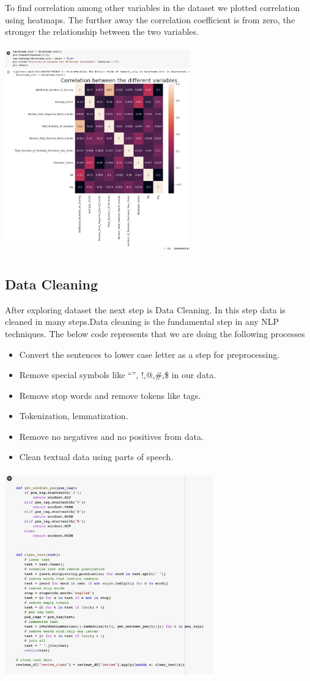 To find correlation among other variables in the dataset we plotted correlation using heatmaps. The further away the correlation coefficient is from zero, the stronger the relationship between the two variables.

\includegraphics[width=8cm, height=9cm ]{ccorellation.jpeg}

\subsection{Data Cleaning}
After exploring dataset the next step is Data Cleaning. In this step data is cleaned in many steps.Data cleaning is the fundamental step in any NLP techniques. The below code represents that we are doing the following processes
\begin{itemize}

\item Convert the sentences to lower case letter as a step for preprocessing.
\item Remove special symbols like “”, !,@,\#,\$ in our data.
\item Remove stop words and remove tokens like tags.
\item Tokenization, lemmatization.
\item Remove no negatives and no positives from data.
\item Clean textual data using parts of speech.

\end{itemize}
\includegraphics[width=9cm, height=9cm ]{data_cleaning.jpeg}
